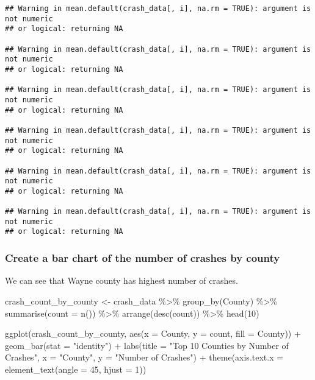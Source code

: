 \documentclass[
]{article}
\newenvironment{Shaded}{\begin{snugshade}}{\end{snugshade}}
\newcommand{\AttributeTok}[1]{\textcolor[rgb]{0.77,0.63,0.00}{#1}}
\newcommand{\DecValTok}[1]{\textcolor[rgb]{0.00,0.00,0.81}{#1}}
\newcommand{\FunctionTok}[1]{\textcolor[rgb]{0.00,0.00,0.00}{#1}}
\newcommand{\NormalTok}[1]{#1}
\newcommand{\OtherTok}[1]{\textcolor[rgb]{0.56,0.35,0.01}{#1}}
\newcommand{\SpecialCharTok}[1]{\textcolor[rgb]{0.00,0.00,0.00}{#1}}
\newcommand{\StringTok}[1]{\textcolor[rgb]{0.31,0.60,0.02}{#1}}
\begin{document}
\begin{verbatim}
## Warning in mean.default(crash_data[, i], na.rm = TRUE): argument is not numeric
## or logical: returning NA

## Warning in mean.default(crash_data[, i], na.rm = TRUE): argument is not numeric
## or logical: returning NA

## Warning in mean.default(crash_data[, i], na.rm = TRUE): argument is not numeric
## or logical: returning NA

## Warning in mean.default(crash_data[, i], na.rm = TRUE): argument is not numeric
## or logical: returning NA

## Warning in mean.default(crash_data[, i], na.rm = TRUE): argument is not numeric
## or logical: returning NA

## Warning in mean.default(crash_data[, i], na.rm = TRUE): argument is not numeric
## or logical: returning NA
\end{verbatim}

\hypertarget{create-a-bar-chart-of-the-number-of-crashes-by-county}{%
\subsubsection{Create a bar chart of the number of crashes by
county}\label{create-a-bar-chart-of-the-number-of-crashes-by-county}}

We can see that Wayne county has highest number of crashes.

\begin{Shaded}
\begin{Highlighting}[]
\NormalTok{crash\_count\_by\_county }\OtherTok{\textless{}{-}}\NormalTok{ crash\_data }\SpecialCharTok{\%\textgreater{}\%}
  \FunctionTok{group\_by}\NormalTok{(County) }\SpecialCharTok{\%\textgreater{}\%}
  \FunctionTok{summarise}\NormalTok{(}\AttributeTok{count =} \FunctionTok{n}\NormalTok{()) }\SpecialCharTok{\%\textgreater{}\%}
  \FunctionTok{arrange}\NormalTok{(}\FunctionTok{desc}\NormalTok{(count)) }\SpecialCharTok{\%\textgreater{}\%}
  \FunctionTok{head}\NormalTok{(}\DecValTok{10}\NormalTok{)}

\FunctionTok{ggplot}\NormalTok{(crash\_count\_by\_county, }\FunctionTok{aes}\NormalTok{(}\AttributeTok{x =}\NormalTok{ County, }\AttributeTok{y =}\NormalTok{ count, }\AttributeTok{fill =}\NormalTok{ County)) }\SpecialCharTok{+}
  \FunctionTok{geom\_bar}\NormalTok{(}\AttributeTok{stat =} \StringTok{"identity"}\NormalTok{) }\SpecialCharTok{+}
  \FunctionTok{labs}\NormalTok{(}\AttributeTok{title =} \StringTok{"Top 10 Counties by Number of Crashes"}\NormalTok{, }\AttributeTok{x =} \StringTok{"County"}\NormalTok{, }\AttributeTok{y =} \StringTok{"Number of Crashes"}\NormalTok{) }\SpecialCharTok{+}
  \FunctionTok{theme}\NormalTok{(}\AttributeTok{axis.text.x =} \FunctionTok{element\_text}\NormalTok{(}\AttributeTok{angle =} \DecValTok{45}\NormalTok{, }\AttributeTok{hjust =} \DecValTok{1}\NormalTok{))}
\end{Highlighting}
\end{Shaded}
\end{document}
